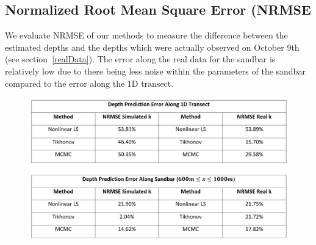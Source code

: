 \subsection{Normalized Root Mean Square Error (NRMSE}
We evaluate NRMSE of our methods to measure the difference between the estimated depths and the depths which were actually observed on October 9th (see section~\ref{realData}). The error along the real data for the sandbar is relatively low due to there being less noise within the parameters of the sandbar compared to the error along the 1D transect.

\begin{figure}[h]
		\centering
		\includegraphics[width=0.80\linewidth]{img/NRMSE_Chart.png}
\end{figure}
		
